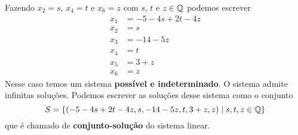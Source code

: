 \begin{exemplos}
\begin{solucao}
\begin{enumerate}
            Fazendo $x_2 = s$, $x_4 = t$ e $x_6 = z$ com $s$, $t$ e $z \in \mathbb{Q}$ podemos escrever
            \begin{align*}
                x_1 &= -5 - 4s + 2t - 4z\\
                x_2 &= s\\
                x_3 &= -14 - 5z\\
                x_4 &= t\\
                x_5 &= 3 + z\\
                x_6 &= z
            \end{align*}
            Nesse caso temos um sistema \textbf{possível e indeterminado}. O sistema admite infinitas soluções. Podemos escrever as soluções desse sistema como o conjunto
            \[
                S = \{(-5 - 4s + 2t - 4z, s, -14 - 5z, t, 3 + z, z) \mid s, t, z \in \mathbb{Q}\}
            \]
            que é chamado de \textbf{conjunto-solução} do sistema linear.


\end{enumerate}
\end{solucao}
\end{exemplos}
